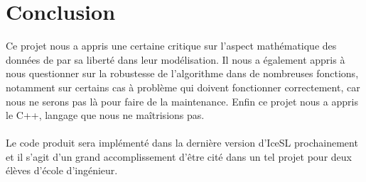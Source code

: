 \documentclass[11pt]{article}
\begin{document}
\section*{Conclusion}

Ce projet nous a appris une certaine critique sur l'aspect mathématique des données de par sa liberté dans leur modélisation. Il nous a également appris à nous questionner sur la robustesse de l'algorithme dans de nombreuses fonctions, notamment sur certains cas à problème qui doivent fonctionner correctement, car nous ne serons pas là pour faire de la maintenance. Enfin ce projet nous a appris le C++, langage que nous ne maîtrisions pas.

\paragraph*{}
Le code produit sera implémenté dans la dernière version d'IceSL prochainement et il s'agit d'un grand accomplissement d'être cité dans un tel projet pour deux élèves d'école d'ingénieur.
\end{document}
